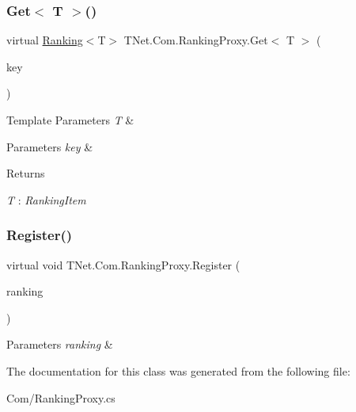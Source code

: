 \subsubsection{\texorpdfstring{Get$<$ T $>$()}{Get< T >()}}
{\footnotesize\ttfamily virtual \mbox{\hyperlink{class_t_net_1_1_com_1_1_rank_1_1_ranking}{Ranking}}$<$T$>$ T\+Net.\+Com.\+Ranking\+Proxy.\+Get$<$ T $>$ (\begin{DoxyParamCaption}\item[{string}]{key }\end{DoxyParamCaption})\hspace{0.3cm}{\ttfamily [virtual]}}






\begin{DoxyTemplParams}{Template Parameters}
{\em T} & \\
\hline
\end{DoxyTemplParams}

\begin{DoxyParams}{Parameters}
{\em key} & \\
\hline
\end{DoxyParams}
\begin{DoxyReturn}{Returns}

\end{DoxyReturn}
\begin{Desc}
\item[Type Constraints]\begin{description}
\item[{\em T} : {\em Ranking\+Item}]\end{description}
\end{Desc}
\mbox{\label{class_t_net_1_1_com_1_1_ranking_proxy_a546f13778dc23b3c9b6e8f41ccafc020}} 
\subsubsection{\texorpdfstring{Register()}{Register()}}
{\footnotesize\ttfamily virtual void T\+Net.\+Com.\+Ranking\+Proxy.\+Register (\begin{DoxyParamCaption}\item[{\mbox{\hyperlink{interface_t_net_1_1_com_1_1_rank_1_1_i_ranking}{I\+Ranking}}}]{ranking }\end{DoxyParamCaption})\hspace{0.3cm}{\ttfamily [virtual]}}






\begin{DoxyParams}{Parameters}
{\em ranking} & \\
\hline
\end{DoxyParams}


The documentation for this class was generated from the following file\+:\begin{DoxyCompactItemize}
\item 
Com/Ranking\+Proxy.\+cs\end{DoxyCompactItemize}
